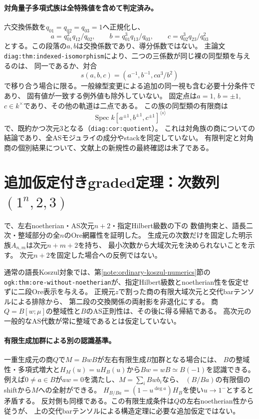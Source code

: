 \documentclass[11pt,a4paper]{ltjsarticle}
\begin{document}
\paragraph{対角量子多項式族は全特殊値を含めて判定済み。}
六交換係数を$q_{01}=q_{02}=q_{03}=1$へ正規化し、
\[
a=q_{01}^2q_{12}/q_{02},\qquad
b=q_{01}^3q_{13}/q_{03},\qquad
c=q_{02}^3q_{23}/q_{03}^2
\]
とする。この段落の$a,b$は交換係数であり、導分係数ではない。
主論文\texttt{diag:thm:indexed-isomorphism}により、二つの三係数が同じ裸の同型類を与えるのは、
同一であるか、対合
\[
s(a,b,c)=(a^{-1},b^{-1},ca^3/b^2)
\]
で移り合う場合に限る。一般線型変更による追加の同一視も含む必要十分条件であり、
固有値が一致する例外値も除外していない。
固定点は$a=1$, $b=\pm1$, $c\in k^\times$であり、その他の軌道は二点である。
この族の同型類の有限商は
\[
\operatorname{Spec}k[a^{\pm1},b^{\pm1},c^{\pm1}]^{\langle s\rangle}
\]
で、既約かつ次元3となる（\texttt{diag:cor:quotient}）。
これは対角族の商についての結論であり、全ASモジュライの成分やstackを同定していない。
有限判定と対角商の個別結果について、文献上の新規性の最終確認は未了である。

\section{追加仮定付きgraded定理：次数列\texorpdfstring{$(1^n,2,3)$}{(1ⁿ,2,3)}}
で、左右noetherian・AS次元$n+2$・指定Hilbert級数の下の
数値拘束と、語長二次・整域部分の全$n$のOre網羅性を証明した。
生成元の次数だけを固定した明示族$A_{n,m}$は次元$n+m+2$を持ち、
最小次数から大域次元を決められないことを示す。
次元$n+2$を固定した場合への反例ではない。

通常の語長Koszul対象では、第\ref{note:ordinary-koszul-numerics}節の
\texttt{ogk:thm:ore-without-noetherian}が、指定Hilbert級数とnoetherian性を仮定せずに二段Ore表示を与える。
正規元$z$で割った商の有限大域次元と交代barテンソルによる排除から、
第二段の交換関係の両射影を非退化にする。
商$Q=B[w;\mu]$の整域性と$B$のAS正則性は、その後に得る帰結である。
高次元の一般的なAS代数が常に整域であるとは仮定していない。

\paragraph{有限生成加群による別の認識基準。}
一重生成元の商$Q$で$M=BwB$が左右有限生成$B$加群となる場合には、
$B$の整域性・多項式増大と$H_M(u)=uH_B(u)$から$Bw=wB\simeq B(-1)$を認識できる。
例えば$0\ne a\in B$が$aw=0$を満たし、$M=\sum_iBwb_i$なら、
$(B/Ba)$の有限個のshiftから$M$への全射ができる。
$H_{B/Ba}=(1-u^{\deg a})H_B$を使い$u\to1^-$とすると矛盾する。
反対側も同様である。この有限生成条件は$Q$の左右noetherian性から従うが、
上の交代barテンソルによる構造定理に必要な追加仮定ではない。
\end{document}
